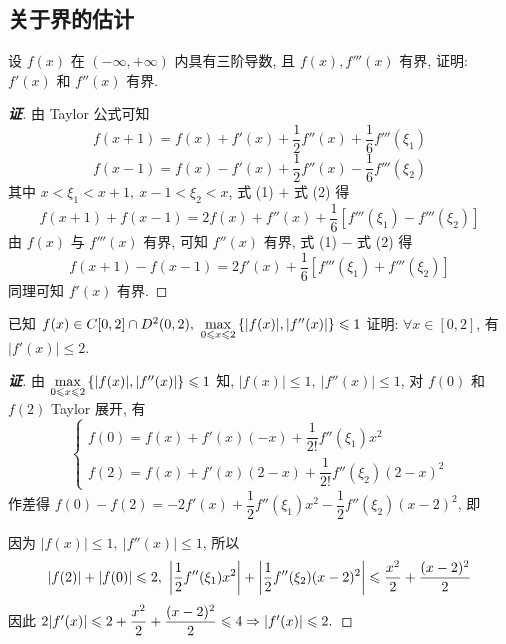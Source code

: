\subsection{关于界的估计}

\begin{example}
    设 $f(x)$ 在 $(-\infty,+\infty)$ 内具有三阶导数, 且 $f(x),f'''(x)$ 有界, 证明: $f'(x)$ 和 $f''(x)$ 有界.
\end{example}
\begin{proof}[{\songti \textbf{证}}]
    由 Taylor 公式可知
    \begin{equation}
        f(x+1 ) =f(x)+f'(x) +\dfrac{1}{2}f''(x) +\dfrac{1}{6}f'''(\xi_1 ) \tag{1}
    \end{equation}
    \begin{equation}
        f(x-1 ) =f(x) -f'(x) +\dfrac{1}{2}f''(x) -\dfrac{1}{6}f'''(\xi_2 ) \tag{2}
    \end{equation}
    其中 $x <\xi _{1} <x+1,~x-1 <\xi _{2} <x$, 式 (1) $+$ 式 (2) 得
    $$f(x+1 ) +f(x-1 ) =2f(x) +f''(x) +\dfrac{1}{6}\left[ f'''(\xi_1 ) -f'''(\xi_2 ) \right] $$
    由 $f(x)$ 与 $f'''(x)$ 有界, 可知 $f''(x)$ 有界, 式 (1) $-$ 式 (2) 得
    $$f(x+1 ) -f(x-1 ) =2f'(x) +\dfrac{1}{6}\left[ f'''(\xi_1 ) +f'''(\xi_2 ) \right] $$
    同理可知 $f'(x)$ 有界.
\end{proof}

\begin{example}
    已知 $f(x)\in C[0,2]\cap D^2(0,2),~\max\limits_{0\leqslant x\leqslant 2}\qty{|f(x)|,|f''(x)|}\leqslant 1$ 证明: $\forall x\in[0,2]$, 有 $|f'(x)|\leqslant 2.$
\end{example}
\begin{proof}[{\songti \textbf{证}}]
    由 $\max\limits_{0\leqslant x\leqslant 2}\qty{|f(x)|,|f''(x)|}\leqslant 1$ 知, $|f(x)|\leqslant 1,~|f''(x)|\leqslant 1$, 对 $f(0)$ 和 $f(2)$ Taylor 展开, 有
    $$\begin{cases}
        f(0)=f(x)+f'(x)(-x)+\dfrac{1}{2!}f''(\xi_1)x^2\\[6pt]
        f(2)=f(x)+f'(x)(2-x)+\dfrac{1}{2!}f''(\xi_2)(2-x)^2
    \end{cases}$$
    作差得 $f(0)-f(2)=-2f'(x)+\dfrac{1}{2}f''(\xi_1)x^2-\dfrac{1}{2}f''(\xi_2)(x-2)^2$, 即 
    因为 $|f(x)|\leqslant 1,~|f''(x)|\leqslant 1$, 所以 $$|f(2)|+|f(0)|\leqslant 2,~\qty|\dfrac{1}{2}f''(\xi_1)x^2|+\qty|\dfrac{1}{2}f''(\xi_2)(x-2)^2|\leqslant \dfrac{x^2}{2}+\dfrac{(x-2)^2}{2}$$
    因此 $2\qty|f'(x)|\leqslant 2+\dfrac{x^2}{2}+\dfrac{(x-2)^2}{2}\leqslant 4\Rightarrow |f'(x)|\leqslant 2.$
\end{proof}

